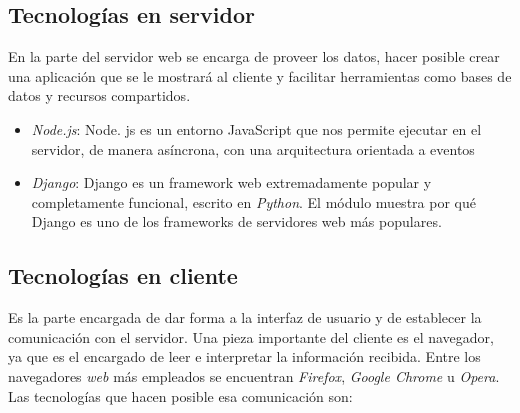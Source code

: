 \subsection{Tecnologías en servidor}
\label{subsec:tecserver}
En la parte del servidor web se encarga de proveer los datos, hacer posible crear una aplicación que se le mostrará al cliente y facilitar herramientas como bases de datos y recursos compartidos. 
\begin{itemize}
    \item \textit{Node.js}: Node. js es un entorno JavaScript que nos permite ejecutar en el servidor, de manera asíncrona, con una arquitectura orientada a eventos   
    \item \textit{Django}: Django es un framework web extremadamente popular y completamente funcional, escrito en  \textit{Python}. El módulo muestra por qué Django es uno de los frameworks de servidores web más populares.
\end{itemize}

\subsection{Tecnologías en cliente}
\label{subsec:tecclient}
Es la parte encargada de dar forma a la interfaz de usuario y de establecer la comunicación con el servidor. Una pieza importante del cliente es el navegador, ya que es el encargado de leer e interpretar la información recibida. Entre los navegadores \textit{web} más empleados se encuentran \textit{Firefox}, \textit{Google Chrome} u \textit{Opera}\cite{bib:navegadores}. Las tecnologías que hacen posible esa comunicación son: 

